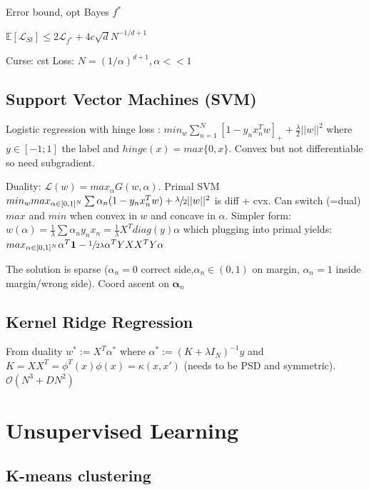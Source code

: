 Error bound, opt Bayes $f^*$

$\mathbb{E}[\mathcal{L}_{St}] \le 2 \mathcal{L}_{f^*} + 4 c \sqrt{d} N^{-1/d+1}$

Curse: cst Loss: $N=(1/\alpha)^{d+1}, \alpha << 1$

\subsection{Support Vector Machines (SVM)}
Logistic regression with hinge loss :
$min_w \sum_{n=1}^N [1-y_n x_n^T w]_+ + \frac{\lambda}{2} ||w||^2$ where $y \in [-1;1]$ the label and $hinge(x)= max\{0,x\}$. Convex but not differentiable so need subgradient.

Duality: $\mathcal{L}(w) = max_{\alpha} G(w, \alpha)$. Primal SVM 
$min_{w} max_{\alpha \in [0,1]^N} \sum \alpha_n (1 - y_nx_n^Tw) + \sfrac{\lambda}{2} ||w||^2$ is diff + cvx. Can switch (=dual) $max$ and $min$ when convex in $w$ and concave in $\alpha$. Simpler form:\newline
$w(\alpha) = \frac{1}{\lambda} \sum \alpha_n y_n x_n = \frac{1}{\lambda} X^T diag(y) \alpha$ which plugging into primal yields:\newline
$max_{\alpha \in [0,1]^N} \alpha^T\mathbf{1} - \sfrac{1}{2\lambda} \alpha^T Y X X^T Y \alpha$\newline


The solution is sparse ($\alpha_n = 0$ correct side,$\alpha_n \in (0,1)$ on margin, $\alpha_n =1$ inside margin/wrong side). Coord ascent on $\boldsymbol{\alpha}_n$

\subsection{Kernel Ridge Regression}
From duality $w^* := X^T \alpha^*$ where $\alpha^* := (K + \lambda I_N)^{-1}y$ and $K=XX^T = \phi^T(x) \phi(x) = \kappa(x,x')$ (needs to be PSD and symmetric). $\mathcal{O}(N^3+DN^2)$


\section{Unsupervised Learning}
\subsection{K-means clustering}

